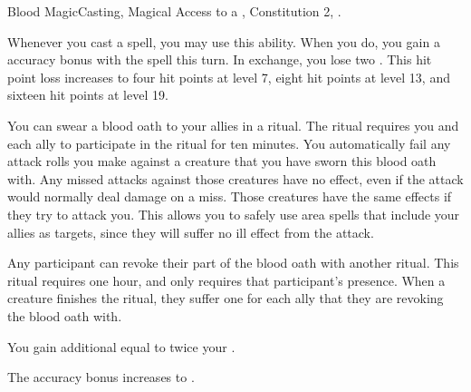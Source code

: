   \begin{magicalfeat}{Blood Magic}{Casting, Magical}
    \featpre Access to a , Constitution 2, .

     Whenever you cast a spell, you may use this ability.
    When you do, you gain a  accuracy bonus with the spell this turn.
    In exchange, you lose two .
    This hit point loss increases to four hit points at level 7, eight hit points at level 13, and sixteen hit points at level 19.

     You can swear a blood oath to your allies in a ritual.
    The ritual requires you and each ally to participate in the ritual for ten minutes.
    You automatically fail any attack rolls you make against a creature that you have sworn this blood oath with.
    Any missed attacks against those creatures have no effect, even if the attack would normally deal damage on a miss.
    Those creatures have the same effects if they try to attack you.
    This allows you to safely use area spells that include your allies as targets, since they will suffer no ill effect from the attack.

    Any participant can revoke their part of the blood oath with another ritual.
    This ritual requires one hour, and only requires that participant's presence.
    When a creature finishes the ritual, they suffer one  for each ally that they are revoking the blood oath with.

     You gain additional  equal to twice your .

     The accuracy bonus increases to .
  \end{magicalfeat}

